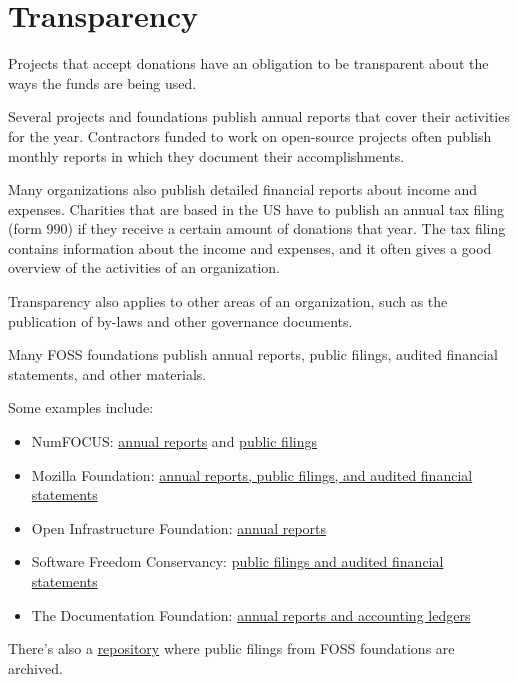 


\chapter{Transparency}

Projects that accept donations have an obligation to be transparent about the ways the funds are being used.

Several projects and foundations publish annual reports that cover their activities for the year.  Contractors funded to work on open-source projects often publish monthly reports in which they document their accomplishments.

Many organizations also publish detailed financial reports about income and expenses.  Charities that are based in the US have to publish an annual tax filing (form 990) if they receive a certain amount of donations that year.  The tax filing contains information about the income and expenses, and it often gives a good overview of the activities of an organization.

Transparency also applies to other areas of an organization, such as the publication of by-laws and other governance documents.

\begin{kaobox}[frametitle=Transparency of FOSS foundations]

Many FOSS foundations publish annual reports, public filings, audited financial statements, and other materials.

Some examples include:

\begin{itemize}

\item NumFOCUS: \href{https://numfocus.org/community/mission/annual-reports}{annual reports} and \href{https://numfocus.org/legal}{public filings}
\item Mozilla Foundation: \href{https://www.mozilla.org/en-US/foundation/annualreport}{annual reports, public filings, and audited financial statements}
\item Open Infrastructure Foundation: \href{https://openinfra.dev/about/}{annual reports}
\item Software Freedom Conservancy: \href{https://sfconservancy.org/about/filings/}{public filings and audited financial statements}
\item The Documentation Foundation: \href{https://www.documentfoundation.org/foundation/financials/}{annual reports and accounting ledgers}

\end{itemize}

There's also a \href{https://gitlab.com/floss-foundations/npo-public-filings}{repository} where public filings from FOSS foundations are archived.

\end{kaobox}

